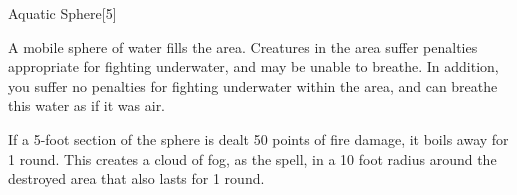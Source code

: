 \begin{spellsection}{Aquatic Sphere}[5]
    \begin{spellheader}
    \end{spellheader}
    \begin{spellcontent}
        \begin{spelltargetinginfo}
        \end{spelltargetinginfo}
        \begin{spelleffects}
            \spelleffect A mobile sphere of water fills the area.
            Creatures in the area suffer penalties appropriate for fighting underwater, and may be unable to breathe.
            In addition, you suffer no penalties for fighting underwater within the area, and can breathe this water as if it was air.
            \spelldur \durshort
        \end{spelleffects}
    \end{spellcontent}
    \begin{spellfooter}
        \spellnotes If a 5-foot section of the sphere is dealt 50 points of fire damage, it boils away for 1 round.
        This creates a cloud of fog, as the  spell, in a 10 foot radius around the destroyed area that also lasts for 1 round.
        \miscastexplode
    \end{spellfooter}
    \begin{spellaugments}
    \end{spellaugments}
\end{spellsection}


